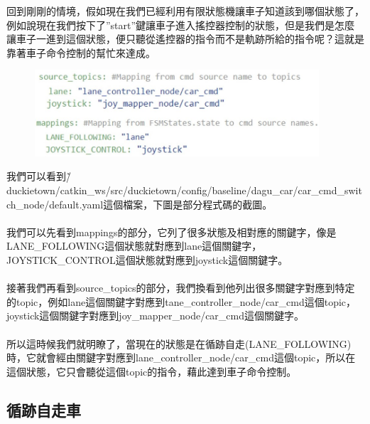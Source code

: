 \documentclass{article}
\begin{document}
回到剛剛的情境，假如現在我們已經利用有限狀態機讓車子知道該到哪個狀態了，例如說現在我們按下了”start”鍵讓車子進入搖控器控制的狀態，但是我們是怎麼讓車子一進到這個狀態，便只聽從遙控器的指令而不是軌跡所給的指令呢？這就是靠著車子命令控制的幫忙來達成。
\begin{figure}[htp]
    \begin{center}
        \includegraphics[width=300pt]{pic/圖片28.jpg}
    \end{center}
\end{figure}
我們可以看到\~/duckietown/catkin\_ws/src/duckietown/config/baseline/dagu\_car/car\_cmd\_switch\_node/default.yaml這個檔案，下圖是部分程式碼的截圖。
\\
\\我們可以先看到mappings的部分，它列了很多狀態及相對應的關鍵字，像是LANE\_FOLLOWING這個狀態就對應到lane這個關鍵字，JOYSTICK\_CONTROL這個狀態就對應到joystick這個關鍵字。
\\
\\接著我們再看到source\_topics的部分，我們換看到他列出很多關鍵字對應到特定的topic，例如lane這個關鍵字對應到tane\_controller\_node/car\_cmd這個topic，joystick這個關鍵字對應到joy\_mapper\_node/car\_cmd這個關鍵字。
\\
\\所以這時候我們就明瞭了，當現在的狀態是在循跡自走(LANE\_FOLLOWING)時，它就會經由關鍵字對應到lane\_controller\_node/car\_cmd這個topic，所以在這個狀態，它只會聽從這個topic的指令，藉此達到車子命令控制。
\\

\subsection{循跡自走車}
\end{document}
